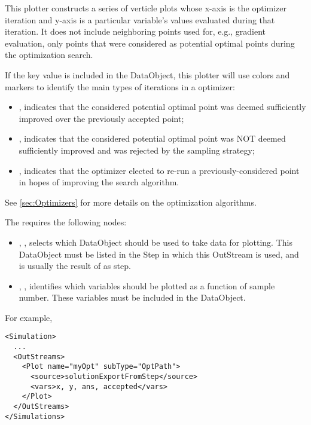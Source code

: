 This plotter
constructs a series of verticle plots whose x-axis is the optimizer iteration and y-axis is a
particular variable's values evaluated during that iteration. It does not include neighboring points
used for, e.g., gradient evaluation, only points that were considered as potential optimal points during
the optimization search.

If the  key value is included in the  DataObject, this
plotter will use colors and markers to identify the main types of iterations in a
optimizer:
\begin{itemize}
  \item {}, indicates that the considered potential optimal point was deemed
        sufficiently improved over the previously accepted point;
  \item {}, indicates that the considered potential optimal point was NOT deemed
        sufficiently improved and was rejected by the sampling strategy;
  \item {}, indicates that the optimizer elected to re-run a previously-considered
        point in hopes of improving the search algorithm.
\end{itemize}
See \ref{sec:Optimizers} for more details on the optimization algorithms.


The   requires the following nodes:
\begin{itemize}
  \item {}, , selects which DataObject should be used
      to take data for plotting. This DataObject must be listed in the Step in which this
      OutStream is used, and is usually the result of as  step.
  \item {}, , identifies which variables should
      be plotted as a function of sample number. These variables must be included in the 
      DataObject.
\end{itemize}

For example,
\begin{lstlisting}[style=XML]
<Simulation>
  ...
  <OutStreams>
    <Plot name="myOpt" subType="OptPath">
      <source>solutionExportFromStep</source>
      <vars>x, y, ans, accepted</vars>
    </Plot>
  </OutStreams>
</Simulations>
\end{lstlisting}



